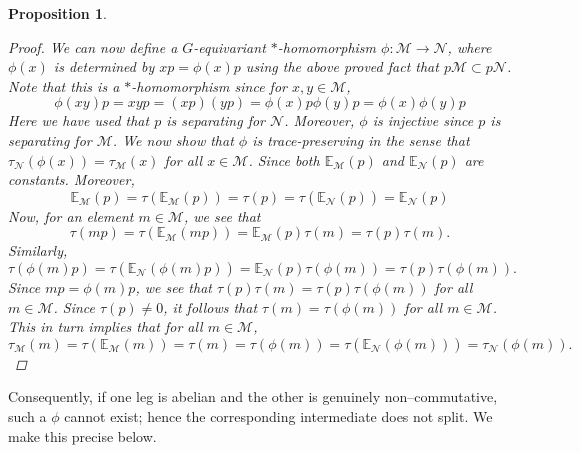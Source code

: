 \documentclass[12pt]{amsart}
\newtheorem{proposition}[thm]{Proposition}
\theoremstyle{definition}
\begin{document}
\begin{proposition}
\begin{proof}
We can now define a $G$-equivariant $*$-homomorphism $\phi:\mathcal{M}\to\mathcal{N}$, where $\phi(x)$ is determined by $xp=\phi(x)p$ using the above proved fact that $p\mathcal{M}\subset p\mathcal{N}$. Note that this is a $*$-homomorphism since for $x,y\in\mathcal{M}$,
\[\phi(xy)p=xyp=(xp)(yp)=\phi(x)p\phi(y)p=\phi(x)\phi(y)p\]
Here we have used that $p$ is separating for $\mathcal{N}$. Moreover, $\phi$ is injective since $p$ is separating for $\mathcal{M}$. We now show that $\phi$ is trace-preserving in the sense that $\tau_{\mathcal{N}}(\phi(x))=\tau_{\mathcal{M}}(x)$ for all $x\in\mathcal{M}$.
Since both $\mathbb{E}_{\mathcal{M}}(p)$ and $\mathbb{E}_{\mathcal{N}}(p)$ are constants. Moreover,
\[\mathbb{E}_{\mathcal{M}}(p)=\tau\left(\mathbb{E}_{\mathcal{M}}(p)\right)=\tau(p)=\tau\left(\mathbb{E}_{\mathcal{N}}(p)\right)=\mathbb{E}_{\mathcal{N}}(p)\]
Now, for an element $m\in\mathcal{M}$, we see that
\[\tau(mp)=\tau\left(\mathbb{E}_{\mathcal{M}}(mp)\right)=\mathbb{E}_{\mathcal{M}}(p)\tau(m)=\tau(p)\tau(m).\]
Similarly,
\[\tau(\phi(m)p)=\tau\left(\mathbb{E}_{\mathcal{N}}(\phi(m)p)\right)=\mathbb{E}_{\mathcal{N}}(p)\tau(\phi(m))=\tau(p)\tau(\phi(m)).\]
Since $mp=\phi(m)p$, we see that $\tau(p)\tau(m)=\tau(p)\tau(\phi(m))$ for all $m\in\mathcal{M}$. Since $\tau(p)\ne 0$, it follows that $\tau(m)=\tau(\phi(m))$ for all $m\in\mathcal{M}$. This in turn implies that for all $m\in\mathcal{M}$,
\[\tau_{\mathcal{M}}(m)=\tau\left(\mathbb{E}_{\mathcal{M}}(m)\right)=\tau(m)=\tau(\phi(m))=\tau\left(\mathbb{E}_{\mathcal{N}}(\phi(m))\right)=\tau_{\mathcal{N}}(\phi(m)).\]
\end{proof}
\end{proposition}
Consequently, if one leg is abelian and the other is genuinely
non–commutative, such a $\phi$ cannot exist; hence the corresponding intermediate does
not split. We make this precise below.
\end{document}
